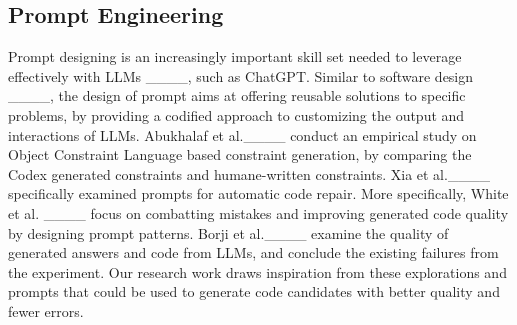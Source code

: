 
\subsection{Prompt Engineering}

Prompt designing is an increasingly important skill set needed to leverage effectively with LLMs ____, such as ChatGPT.
Similar to software design ____, the design of prompt aims at offering reusable solutions to specific problems, 
by providing a codified approach to customizing the output and interactions of LLMs.
Abukhalaf et al.____ conduct an empirical study on Object Constraint Language based constraint generation, by comparing the Codex generated constraints and humane-written constraints.
Xia et al.____ specifically examined prompts for automatic code repair.
More specifically, White et al. ____ focus on combatting mistakes and improving generated code quality by designing prompt patterns.
Borji et al.____ examine the quality of generated answers and code from LLMs, and conclude the existing failures from the experiment. 
Our research work draws inspiration from these explorations and prompts that could be used to generate code candidates with better quality and fewer errors.


